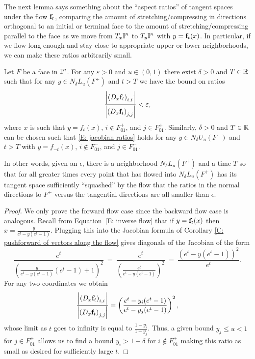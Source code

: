 The next lemma says something about the ``aspect ratios'' of tangent spaces under the flow $\mathbf{f}_t$, comparing the amount of stretching/compressing in directions orthogonal to an initial or terminal face to the amount of stretching/compressing parallel to the face as we move from $T_x\mathbb{I}^n$ to $T_{y}\mathbb{I}^n$ with $y=\mathbf{f}_t(x)$. In particular, if we flow long enough and stay close to appropriate upper or lower neighborhoods, we can make these ratios arbitrarily small.

\begin{lemma}\label{L: jacobian ratios}
	Let $F$ be a face in $\mathbb{I}^n$. For any $\varepsilon > 0$ and $u \in (0,1)$ there exist $\delta > 0$ and $T\in \mathbb{R}$ such that for any $y \in N_\delta L_u(F^+)$ and $t>T$ we have the bound on ratios
	\begin{equation}\label{E: jacobian ratios}
		\frac{\left|\left(D_{x}\mathbf{f}_t\right)_{i,i}\right|}
		{\left|\left(D_{x}\mathbf{f}_t\right)_{j,j}\right|} < \varepsilon,
	\end{equation}
	where $x$ is such that $y = f_t(x)$, $i \not\in F^+_{01}$, and $j \in F^+_{01}$. Similarly, $\delta > 0$ and $T\in \mathbb{R}$ can be chosen such that \eqref{E: jacobian ratios} holds for any $y \in N_\delta U_u(F^-)$ and $t>T$ with $y = f_{-t}(x)$, $i \not\in F^-_{01}$, and $j \in F^-_{01}$.
\end{lemma}
In other words, given an $\epsilon$, there is a neighborhood $N_\delta L_u(F^+)$ and a time $T$ so that for all greater times every point that has flowed into $N_\delta L_u(F^+)$ has its tangent space sufficiently ``squashed'' by the flow that the ratios in the normal directions to $F^+$ versus the tangential directions are all smaller than $\epsilon$.

\begin{proof}
	We only prove the forward flow case since the backward flow case is analogous.
	Recall from Equation~\eqref{E: inverse flow} that if $y = \mathbf{f}_t(x)$ then $x = \frac{y}{e^t-y(e^t-1)}$.
	Plugging this into the Jacobian formula of Corollary \ref{C: pushforward of vectors along the flow} gives diagonals of the Jacobian of the form
	\begin{equation*}
		\frac{e^t}{\left(\frac{y}{e^t-y(e^t-1)}(e^t -1) + 1\right)^2} \ = \
		\frac{e^t}{\left(\frac{e^t}{e^t-y(e^t-1)}\right)^2} \ = \
		\frac{\left(e^t-y(e^t-1)\right)^2}{e^t}.
	\end{equation*}
	For any two coordinates we obtain
	\begin{equation*}
		\frac{\left|\left(D_{x}\mathbf{f}_t\right)_{i,i}\right|}
		{\left|\left(D_{x}\mathbf{f}_t\right)_{j,j}\right|} = \left(\frac{e^t-y_i(e^t-1)}{e^t-y_j(e^t-1)}\right)^2,
	\end{equation*}
	whose limit as $t$ goes to infinity is equal to $\frac{1-y_i}{1-y_j}$.
	Thus, a given bound $y_j \leq u<1$ for $j \in F^+_{01}$ allows us to find a bound $y_i > 1- \delta$ for $i \not\in F^+_{01}$ making this ratio as small as desired for sufficiently large $t$.
\end{proof}

